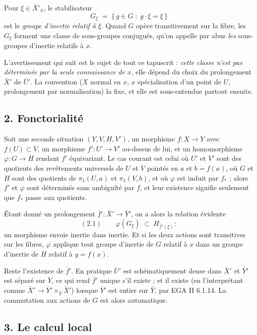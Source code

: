 \documentclass[11pt,a4paper]{article}
\begin{document}
Pour $\xi \in \bar{X}'_{\bar{x}}$, le stabilisateur
\[
  G_{\xi} \;=\; \{\, g \in G \;:\; g\cdot\xi = \xi \,\}
\]
est le \emph{groupe d'inertie relatif à $\xi$}. Quand $G$ opère transitivement
sur la fibre, les $G_{\xi}$ forment une classe de sous-groupes conjugués, qu'on
appelle par abus \emph{les} sous-groupes d'inertie relatifs à $x$.

L'avertissement qui suit est le sujet de tout ce tapuscrit : \emph{cette classe n'est pas déterminée par la seule connaissance
de $x$}, elle dépend du choix du prolongement $\bar{X}'$ de $\bar{U}'$. La
convention ($X$ normal en $x$, $x$ spécialisation d'un point de $U$,
prolongement par normalisation) la fixe, et elle est sous-entendue
partout ensuite.

\subsection*{2. Fonctorialité}

Soit une seconde situation $(Y, V, H, V')$, un morphisme $f : X \to Y$ avec
$f(U) \subset V$, un morphisme $f' : U' \to V'$ au-dessus de lui, et un
homomorphisme $\varphi : G \to H$ rendant $f'$ équivariant. Le cas courant est
celui où $U'$ et $V'$ sont des quotients des revêtements universels de $U$ et
$V$ pointés en $a$ et $b = f(a)$, où $G$ et $H$ sont des quotients de
$\pi_{1}(U,a)$ et $\pi_{1}(V,b)$, et où $\varphi$ est induit par
$f_{*}$ ; alors $f'$ et $\varphi$ sont déterminés sans ambiguïté par $f$, et
leur existence signifie seulement que $f_{*}$ passe aux quotients.

Étant donné un prolongement $\bar{f}' : \bar{X}' \to \bar{Y}'$, on a alors la
relation évidente
\[
  (2.1) \qquad \varphi(G_{\xi}) \;\subset\; H_{\bar{f}'(\xi)} :
\]
un morphisme envoie inertie dans inertie. Et si les deux actions sont
transitives sur les fibres, $\varphi$ applique tout groupe d'inertie de $G$
relatif à $x$ dans un groupe d'inertie de $H$ relatif à $y = f(x)$.

Reste l'existence de $\bar{f}'$. En pratique $\bar{U}'$ est schématiquement
dense dans $\bar{X}'$ et $\bar{Y}'$ est séparé sur $\bar{Y}$, ce qui rend
$\bar{f}'$ unique s'il existe ; et il existe (en l'interprétant comme
$\bar{X}' \to \bar{Y}' \times_{\bar{Y}} \bar{X}'$) lorsque $\bar{Y}'$ est
entier sur $\bar{Y}$, par EGA II 6.1.14. La commutation aux actions de $G$ est
alors automatique.

\subsection*{3. Le calcul local}
\end{document}
